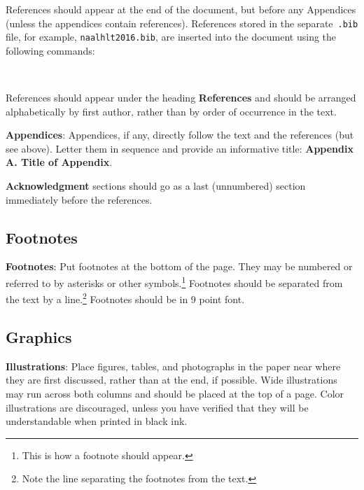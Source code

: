 \documentclass[11pt,letterpaper]{article}
\newcommand\BibTeX{B{\sc ib}\TeX}
\begin{document}
References should appear at the 
end of the document, but before any Appendices (unless the appendices contain references).
References stored in the separate~{\small\tt .bib} file, for example, {\small\tt naalhlt2016.bib}, are inserted into the document using the following commands:

\small
\begin{verbatim}


\end{verbatim}
\normalsize 

References should appear under
the heading {\bf References} and should be arranged alphabetically
by first author, rather than by order of occurrence in the text.  %

{\bf Appendices}: Appendices, if any, directly follow the text and the
references (but see above).  Letter them in sequence and provide an
informative title: {\bf Appendix A. Title of Appendix}.

\textbf{Acknowledgment} sections should go as a last (unnumbered) section immediately
before the references.  


\subsection{Footnotes}

{\bf Footnotes}: Put footnotes at the bottom of the page. They may
be numbered or referred to by asterisks or other
symbols.\footnote{This is how a footnote should appear.} Footnotes
should be separated from the text by a line.\footnote{Note the
line separating the footnotes from the text.}  Footnotes should be in 9 point font.

\subsection{Graphics}

{\bf Illustrations}: Place figures, tables, and photographs in the
paper near where they are first discussed, rather than at the end, if
possible.  Wide illustrations may run across both columns and should be placed at
the top of a page. Color illustrations are discouraged, unless you have verified that 
they will be understandable when printed in black ink. 
\end{document}
